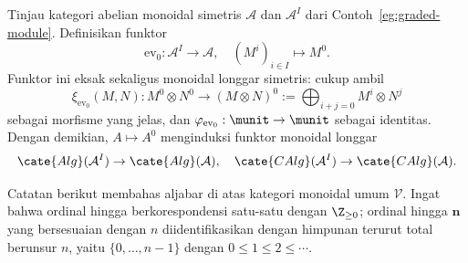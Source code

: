 \begin{contoh}\label{eg:ev0-monoidal}
	Tinjau kategori abelian monoidal simetris $\mathcal{A}$ dan $\mathcal{A}^I$
	dari Contoh~\ref{eg:graded-module}. Definisikan funktor
	\[ \mathrm{ev}_0: \mathcal{A}^I \to \mathcal{A}, \quad \left(M^i\right)_{i \in I} \mapsto M^0. \]
	Funktor ini eksak sekaligus monoidal longgar simetris: cukup ambil
	\[ \xi_{\mathrm{ev}_0}(M, N): M^0 \otimes N^0 \to (M \otimes N)^0 := \bigoplus_{i+j=0} M^i \otimes N^j \]
	sebagai morfisme yang jelas, dan
	$\varphi_{\mathrm{ev}_0}:\munit\to\munit$ sebagai identitas. Dengan demikian,
	$A\mapsto A^0$ menginduksi funktor monoidal longgar
	\[ \cate{Alg}(\mathcal{A}^I) \to \cate{Alg}(\mathcal{A}), \quad \cate{CAlg}(\mathcal{A}^I) \to \cate{CAlg}(\mathcal{A}). \]
\end{contoh}

Catatan berikut membahas aljabar di atas kategori monoidal umum $\mathcal{V}$.
Ingat bahwa ordinal hingga berkorespondensi satu-satu dengan $\Z_{\geq0}$;
ordinal hingga $\mathbf{n}$ yang bersesuaian dengan $n$ diidentifikasikan
dengan himpunan terurut total berunsur $n$, yaitu
$\{0,\ldots,n-1\}$ dengan $0\leq1\leq2\leq\cdots$.

